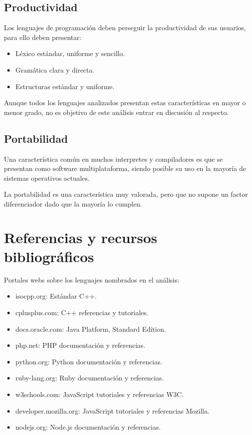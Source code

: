 \subsection{Productividad}
Los lenguajes de programación deben perseguir la productividad de sus usuarios, para ello deben presentar: 
\begin{itemize}
\item Léxico estándar, uniforme y sencillo.
\item Gramática clara y directa.
\item Estructuras estándar y uniforme.
\end{itemize}

Aunque todos los lenguajes analizados presentan estas características en mayor o menor grado, no es objetivo 
de este análisis entrar en discusión al respecto.

\subsection{Portabilidad}
Una característica común en muchos interpretes y compiladores es que se presentan como software multiplataforma,
siendo posible su uso en la mayoría de sistemas operativos actuales. 

La portabilidad es una característica muy valorada, pero que no supone un factor diferenciador dado que la mayoría 
lo cumplen. 

\section{Referencias y recursos bibliográficos}

Portales webs sobre los lenguajes nombrados en el análisis:
\begin{itemize}
\item isocpp.org: Estándar C++.
\item cplusplus.com: C++ referencias y tutoriales.
\item docs.oracle.com: Java Platform, Standard Edition.
\item php.net: PHP documentación y referencias.
\item python.org: Python documentación y referencias.
\item ruby-lang.org: Ruby documentación y referencias.
\item w3schools.com: JavaScript tutoriales y referencias W3C.
\item developer.mozilla.org: JavaScript tutoriales y referencias Mozilla.
\item nodejs.org: Node.js documentación y referencias.
\end{itemize}

